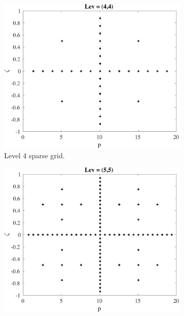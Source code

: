 \documentclass[preprint,11pt]{elsarticle}
\begin{document}
\begin{figure}
	\centering
	\begin{subfigure}{0.32\textwidth} %
		\includegraphics[width=\textwidth]{FIGURES/asgard-sg-lev4.pdf}
		\caption{Level 4 sparse grid.} %
	\end{subfigure}
	\vspace{0.5em} %
	\begin{subfigure}{0.32\textwidth} %
		\includegraphics[width=\textwidth]{FIGURES/asgard-sg-lev5.pdf}

\end{subfigure}
\end{figure}
\end{document}
